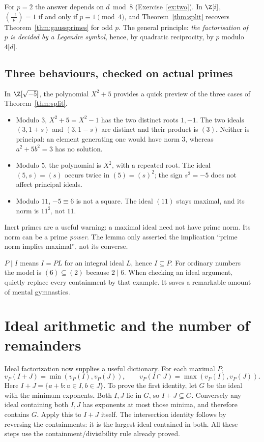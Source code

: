 For $p=2$ the answer depends on $d\bmod8$ (Exercise~\ref{ex:two}). In $\Z[i]$, $\left(\frac{-1}p\right)=1$ if and only if $p\equiv1\pmod4$, and Theorem~\ref{thm:split} recovers Theorem~\ref{thm:gaussprimes} for odd $p$. The general principle: \emph{the factorisation of $p$ is decided by a Legendre symbol}, hence, by quadratic reciprocity, by $p$ modulo $4|d|$.

\subsection*{Three behaviours, checked on actual primes}
In $\Z[\sqrt{-5}]$, the polynomial $X^2+5$ provides a quick preview of the
three cases of Theorem~\ref{thm:split}.
\begin{itemize}
\item Modulo $3$, $X^2+5=X^2-1$ has the two distinct roots $1,-1$.
The two ideals $(3,1+s)$ and $(3,1-s)$ are distinct and their product is $(3)$.
Neither is principal: an element generating one would have norm $3$, whereas
$a^2+5b^2=3$ has no solution.
\item Modulo $5$, the polynomial is $X^2$, with a repeated root. The ideal
$(5,s)=(s)$ occurs twice in $(5)=(s)^2$; the sign $s^2=-5$ does not affect
principal ideals.
\item Modulo $11$, $-5\equiv6$ is not a square. The ideal $(11)$ stays maximal,
and its norm is $11^2$, not $11$.
\end{itemize}
Inert primes are a useful warning: a maximal ideal need not have prime norm.
Its norm can be a prime \emph{power}. The lemma only asserted the implication
``prime norm implies maximal'', not its converse.

\begin{reminder}
$P\mid I$ means $I=PL$ for an integral ideal $L$, hence $I\subseteq P$.
For ordinary numbers the model is $(6)\subseteq(2)$ because $2\mid6$.
When checking an ideal argument, quietly replace every containment by that
example. It saves a remarkable amount of mental gymnastics.
\end{reminder}

\section{Ideal arithmetic and the number of remainders}

Ideal factorization now supplies a useful dictionary. For each maximal $P$,
\[
v_P(I+J)=\min(v_P(I),v_P(J)),\qquad
v_P(I\cap J)=\max(v_P(I),v_P(J)).
\]
Here $I+J=\{a+b:a\in I,b\in J\}$.
To prove the first identity, let $G$ be the ideal with the minimum exponents.
Both $I,J$ lie in $G$, so $I+J\subseteq G$. Conversely any ideal containing
both $I,J$ has exponents at most those minima, and therefore contains $G$.
Apply this to $I+J$ itself. The intersection identity follows by reversing
the containments: it is the largest ideal contained in both.
All these steps use the containment/divisibility rule already proved.

